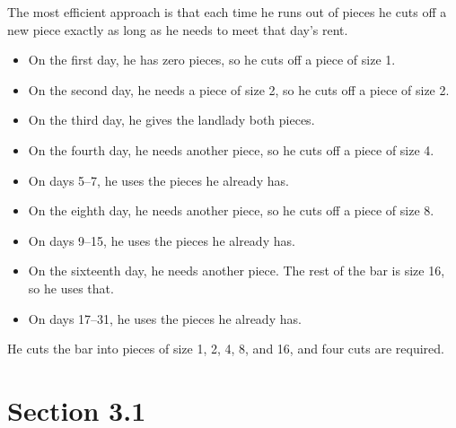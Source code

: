 \documentclass[letterpaper, landscape]{exam}
\begin{document}
  \begin{solution}

      The most efficient approach is that each time he runs out of pieces he cuts off a new piece
      exactly as long as he needs to meet that day's rent.  

      \begin{itemize}
          \item On the first day, he has zero pieces, so he cuts off a piece of size 1.  

          \item On the second day, he needs a piece of size 2, so he cuts off a piece of size 2.

          \item On the third day, he gives the landlady both pieces.

          \item On the fourth day, he needs another piece, so he cuts off a piece of size 4.

          \item On days 5--7, he uses the pieces he already has.

          \item On the eighth day, he needs another piece, so he cuts off a piece of size 8.

          \item On days 9--15, he uses the pieces he already has.

          \item On the sixteenth day, he needs another piece. The rest of the bar is size 16, so he
            uses that.

          \item On days 17--31, he uses the pieces he already has.
      \end{itemize}

      He cuts the bar into pieces of size 1, 2, 4, 8, and 16, and four cuts are required.

  \end{solution}
  \ifprintanswers{}

      \section{Section 3.1} 
\end{document}
